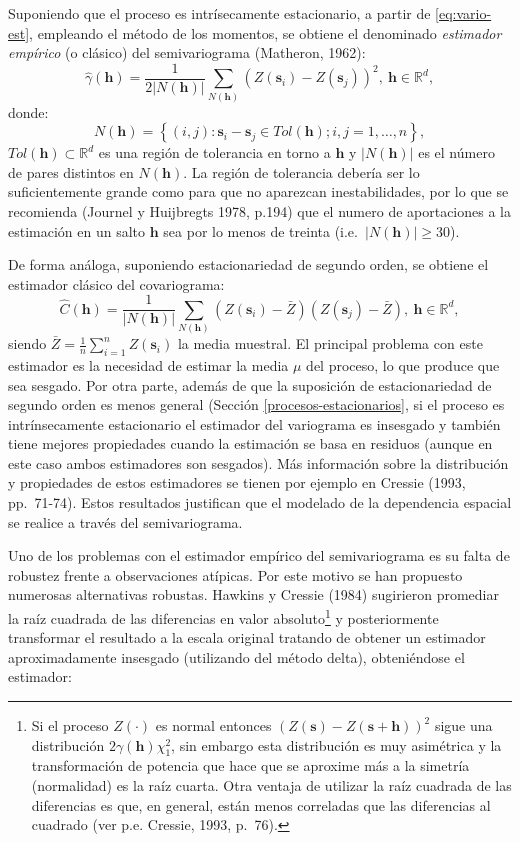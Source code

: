 \documentclass[
  spanish,
]{book}
\theoremstyle{break}
\theoremstyle{definition}
\theoremstyle{definition}
\theoremstyle{definition}
\theoremstyle{definition}
\theoremstyle{remark}
\begin{document}
Suponiendo que el proceso es intrísecamente estacionario, a partir de \eqref{eq:vario-est}, empleando el método de los momentos, se obtiene el denominado \emph{estimador empírico} (o clásico) del semivariograma (Matheron, 1962):
\[\hat{\gamma}(\mathbf{h}) = \dfrac{1}{2\left| N(\mathbf{h})\right| }
\sum\limits_{N(\mathbf{h})}\left( Z(\mathbf{s}_{i})-Z(\mathbf{s}_{j} )\right) ^2 ,\ \mathbf{h}\in \mathbb{R}^{d},\]
donde:
\[N(\mathbf{h}) = \left\{ (i,j):\mathbf{s}_{i} -\mathbf{s}_{j} \in Tol(\mathbf{h});i,j=1,\ldots,n\right\},\]
\(Tol(\mathbf{h})\subset \mathbb{R}^{d}\) es una región de tolerancia en torno a \(\mathbf{h}\) y \(\left| N(\mathbf{h})\right|\) es el número de pares distintos en \(N(\mathbf{h})\).
La región de tolerancia debería ser lo suficientemente grande como para que no aparezcan inestabilidades, por lo que se recomienda (Journel y Huijbregts 1978, p.194) que el numero de aportaciones a la estimación en un salto \(\mathbf{h}\) sea por lo menos de treinta (i.e.~\(\left| N(\mathbf{h})\right| \geq 30\)).

De forma análoga, suponiendo estacionariedad de segundo orden, se obtiene el estimador clásico del covariograma:
\[\hat{C} (\mathbf{h}) = \dfrac{1}{\left| N(\mathbf{h})\right| }
\sum\limits_{N(\mathbf{h})}\left( Z(\mathbf{s}_{i})-\bar{Z} \right)
\left( Z(\mathbf{s}_{j})-\bar{Z} \right),\ \mathbf{h}\in \mathbb{R}^{d},\]
siendo \(\bar{Z} =\frac{1}{n} \sum_{i=1}^{n}Z(\mathbf{s}_{i})\) la media muestral.
El principal problema con este estimador es la necesidad de estimar la media \(\mu\) del proceso, lo que produce que sea sesgado.
Por otra parte, además de que la suposición de estacionariedad de segundo orden es menos general (Sección \ref{procesos-estacionarios}, si el proceso es intrínsecamente estacionario el estimador del variograma es insesgado y también tiene mejores propiedades cuando la estimación se basa en residuos (aunque en este caso ambos estimadores son sesgados).
Más información sobre la distribución y propiedades de estos estimadores se tienen por ejemplo en Cressie (1993, pp.~71-74).
Estos resultados justifican que el modelado de la dependencia espacial se realice a través del semivariograma.

Uno de los problemas con el estimador empírico del semivariograma es su falta de robustez frente a observaciones atípicas.
Por este motivo se han propuesto numerosas alternativas robustas.
Hawkins y Cressie (1984) sugirieron promediar la raíz cuadrada de las diferencias en valor absoluto\footnote{Si el proceso \(Z(\cdot)\) es normal entonces
  \((Z(\mathbf{s})-Z(\mathbf{s}+\mathbf{h}))^2\) sigue una distribución \(2\gamma(\mathbf{h})\chi_1^2\), sin embargo esta distribución es muy asimétrica y la transformación de potencia que hace que se aproxime más a la simetría (normalidad) es la raíz cuarta. Otra ventaja de utilizar la raíz cuadrada de las diferencias es que, en general, están menos correladas que las diferencias al cuadrado (ver p.e. Cressie, 1993, p.~76).} y posteriormente transformar el resultado a la escala original tratando de obtener un estimador aproximadamente insesgado (utilizando del método delta), obteniéndose el estimador:
\end{document}

